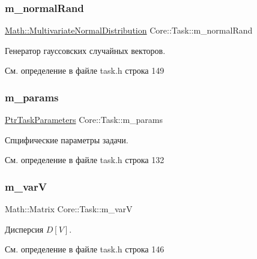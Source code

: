 \subsubsection{\texorpdfstring{m\+\_\+normal\+Rand}{m\_normalRand}}
{\footnotesize\ttfamily \hyperlink{class_math_1_1_multivariate_normal_distribution}{Math\+::\+Multivariate\+Normal\+Distribution} Core\+::\+Task\+::m\+\_\+normal\+Rand\hspace{0.3cm}{\ttfamily [protected]}}

Генератор гауссовских случайных векторов. 

См. определение в файле task.\+h строка 149

\hypertarget{class_core_1_1_task_a99bf439867f7a4f38cde5eb142f4414a}{}\label{class_core_1_1_task_a99bf439867f7a4f38cde5eb142f4414a} 
\subsubsection{\texorpdfstring{m\+\_\+params}{m\_params}}
{\footnotesize\ttfamily \hyperlink{namespace_core_a3e0e555656bf795146ebb0882e28da2f}{Ptr\+Task\+Parameters} Core\+::\+Task\+::m\+\_\+params\hspace{0.3cm}{\ttfamily [protected]}}

Спцифические параметры задачи. 

См. определение в файле task.\+h строка 132

\hypertarget{class_core_1_1_task_af73402499755e2c2931b9d30456fd06a}{}\label{class_core_1_1_task_af73402499755e2c2931b9d30456fd06a} 
\subsubsection{\texorpdfstring{m\+\_\+varV}{m\_varV}}
{\footnotesize\ttfamily Math\+::\+Matrix Core\+::\+Task\+::m\+\_\+varV\hspace{0.3cm}{\ttfamily [protected]}}

Дисперсия $D[V]$. 

См. определение в файле task.\+h строка 146

\hypertarget{class_core_1_1_task_af1239e6079214a8344c44b8ad4c3a23e}{}\label{class_core_1_1_task_af1239e6079214a8344c44b8ad4c3a23e} 
